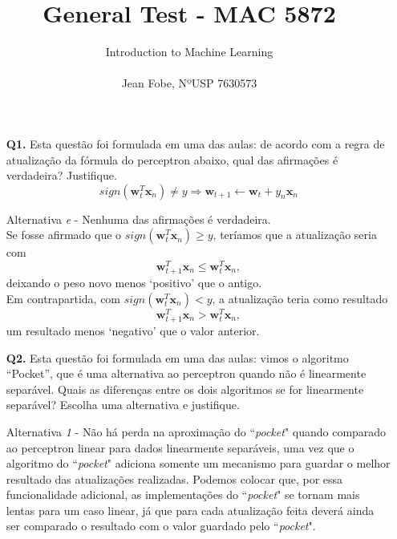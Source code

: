 \documentclass[12pt]{article}
\begin{document}
 
 
\title{General Test - MAC 5872}
\thispagestyle{fancy}
\author{
	Introduction to Machine Learning\\\\
    Jean Fobe, NºUSP 7630573
    }

\maketitle

\begin{enumerate}

\item [\textbf{Q1.}] Esta questão foi formulada em uma das aulas: de acordo com a regra de atualização da fórmula do perceptron abaixo, qual das afirmações é verdadeira? Justifique. \[sign(\mathbf{w}_t^T \mathbf{x}_n) \ne y \Rightarrow \mathbf{w}_{t+1} \leftarrow \mathbf{w}_t + y_n \mathbf{x}_n\]
	\begin{addmargin}[1em]{2em}%
		Alternativa \textit{e} - Nenhuma das afirmações é verdadeira. \\
		Se fosse afirmado que o $sign(\mathbf{w}_t^T \mathbf{x}_n) \geq y$, teríamos que a atualização seria com \[\mathbf{w}_{t+1}^T \mathbf{x}_n \leq \mathbf{w}_t^T \mathbf{x}_n,\] deixando o peso novo menos `positivo' que o antigo. \\
		Em contrapartida, com $sign(\mathbf{w}_t^T \mathbf{x}_n) < y$, a atualização teria como resultado \[\mathbf{w}_{t+1}^T \mathbf{x}_n > \mathbf{w}_t^T \mathbf{x}_n,\] um resultado menos `negativo' que o valor anterior.
	\end{addmargin}
     
\item [\textbf{Q2.}] Esta questão foi formulada em uma das aulas: vimos o algoritmo ``Pocket'', que é uma alternativa ao perceptron quando  não é linearmente separável. Quais as diferenças entre os dois algoritmos se  for linearmente separável? Escolha uma alternativa e justifique. 
	\begin{addmargin}[1em]{2em}%
		Alternativa \textit{1} - Não há perda na aproximação do ``\textit{pocket}" quando comparado ao perceptron linear para dados linearmente separáveis, uma vez que o algoritmo do ``\textit{pocket}" adiciona somente um mecanismo para guardar o melhor resultado das atualizações realizadas. Podemos colocar que, por essa funcionalidade adicional, as implementações do ``\textit{pocket}" se tornam mais lentas para um caso linear, já que para cada atualização feita  deverá ainda ser comparado o resultado com o valor guardado pelo ``\textit{pocket}".
	\end{addmargin}


\end{enumerate}
\end{document}
